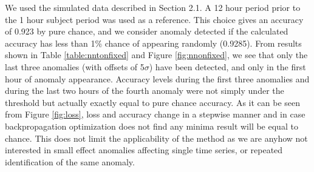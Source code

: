 \documentclass[5p]{elsarticle}
\begin{document}

We used the simulated data described in Section 2.1. A 12 hour  period prior to the 1 hour subject period was used as a reference. This choice gives an accuracy of 0.923 by pure chance, and we consider anomaly detected if the calculated accuracy has less than 1\% chance of appearing randomly (0.9285). From results shown in Table \ref{table:nntonfixed} and Figure \ref{fig:nnonfixed}, we see that only the last three anomalies (with offsets of 5$\sigma$) have been detected, and only in the first hour of anomaly appearance. Accuracy levels during the first three anomalies and during the last two hours of the fourth anomaly were not simply under the threshold but actually exactly equal to pure chance accuracy. As it can be seen from Figure \ref{fig:loss}, loss and accuracy change in a stepwise manner and in case backpropagation optimization does not find any minima result will be equal to chance. This does not limit the applicability of the method as we are anyhow not interested in small effect anomalies affecting single time series, or repeated identification of the same anomaly. 
\end{document}
